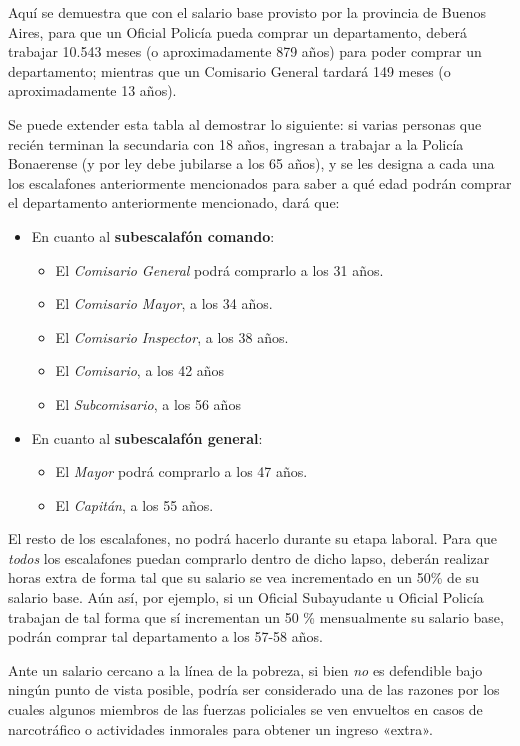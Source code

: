 \documentclass[12pt,a4paper,twoside]{book}
\begin{document}
Aquí se demuestra que con el salario base provisto por la provincia de Buenos Aires, para que un Oficial Policía pueda comprar un departamento, deberá trabajar 10.543 meses (o aproximadamente 879 años) para poder comprar un departamento; mientras que un Comisario General tardará 149 meses (o aproximadamente 13 años).

Se puede extender esta tabla al demostrar lo siguiente: si varias personas que recién terminan la secundaria con 18 años, ingresan a trabajar a la Policía Bonaerense (y por ley debe jubilarse a los 65 años), y se les designa a cada una los escalafones anteriormente mencionados para saber a qué edad podrán comprar el departamento anteriormente mencionado, dará que:

\begin{itemize}
\item En cuanto al \textbf{subescalafón comando}:
	\begin{itemize}
	\item El \textit{Comisario General} podrá comprarlo a los 31 años.
	\item El \textit{Comisario Mayor}, a los 34 años.
	\item El \textit{Comisario Inspector}, a los 38 años.
	\item El \textit{Comisario}, a los 42 años
	\item El \textit{Subcomisario}, a los 56 años
	\end{itemize}
\item En cuanto al \textbf{subescalafón general}:
	\begin{itemize}
	\item El \textit{Mayor} podrá comprarlo a los 47 años.
	\item El \textit{Capitán}, a los 55 años.
	\end{itemize}
\end{itemize}

El resto de los escalafones, no podrá hacerlo durante su etapa laboral. Para que \textit{todos} los escalafones puedan comprarlo dentro de dicho lapso, deberán realizar horas extra de forma tal que su salario se vea incrementado en un 50\% de su salario base. Aún así, por ejemplo, si un Oficial Subayudante u Oficial Policía trabajan de tal forma que sí incrementan un 50 \% mensualmente su salario base, podrán comprar tal departamento a los 57-58 años.

Ante un salario cercano a la línea de la pobreza, si bien \textit{no} es defendible bajo ningún punto de vista posible, podría ser considerado una de las razones por los cuales algunos miembros de las fuerzas policiales se ven envueltos en casos de narcotráfico o actividades inmorales para obtener un ingreso «extra». 
\end{document}
